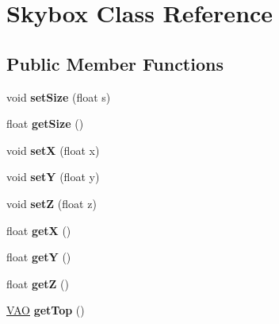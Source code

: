 \hypertarget{class_skybox}{\section{Skybox Class Reference}
\label{class_skybox}
}
\subsection*{Public Member Functions}
\begin{DoxyCompactItemize}
\item 
\hypertarget{class_skybox_a1822fac3c17a38da191076455e00add7}{void {\bfseries set\-Size} (float s)}\label{class_skybox_a1822fac3c17a38da191076455e00add7}

\item 
\hypertarget{class_skybox_a593105a531002093e60528c674f338b3}{float {\bfseries get\-Size} ()}\label{class_skybox_a593105a531002093e60528c674f338b3}

\item 
\hypertarget{class_skybox_ad52e6091b7377a29b5892feab6ae24a9}{void {\bfseries set\-X} (float x)}\label{class_skybox_ad52e6091b7377a29b5892feab6ae24a9}

\item 
\hypertarget{class_skybox_a5ff4f223d49c1b795765739433aec47f}{void {\bfseries set\-Y} (float y)}\label{class_skybox_a5ff4f223d49c1b795765739433aec47f}

\item 
\hypertarget{class_skybox_af2e540481f6fa1fdc0a429288650a05b}{void {\bfseries set\-Z} (float z)}\label{class_skybox_af2e540481f6fa1fdc0a429288650a05b}

\item 
\hypertarget{class_skybox_a8597f7c0f20416747d7f7fc041a4d5d4}{float {\bfseries get\-X} ()}\label{class_skybox_a8597f7c0f20416747d7f7fc041a4d5d4}

\item 
\hypertarget{class_skybox_ab97d7eabeeeba73e2fafa9548602c4f4}{float {\bfseries get\-Y} ()}\label{class_skybox_ab97d7eabeeeba73e2fafa9548602c4f4}

\item 
\hypertarget{class_skybox_a3ac5a95124eac7c4ea1c1317bb3e2082}{float {\bfseries get\-Z} ()}\label{class_skybox_a3ac5a95124eac7c4ea1c1317bb3e2082}

\item 
\hypertarget{class_skybox_a8d9b98ba00cc8652759b44129fca1283}{\hyperlink{class_v_a_o}{V\-A\-O} {\bfseries get\-Top} ()}\label{class_skybox_a8d9b98ba00cc8652759b44129fca1283}


\end{DoxyCompactItemize}
